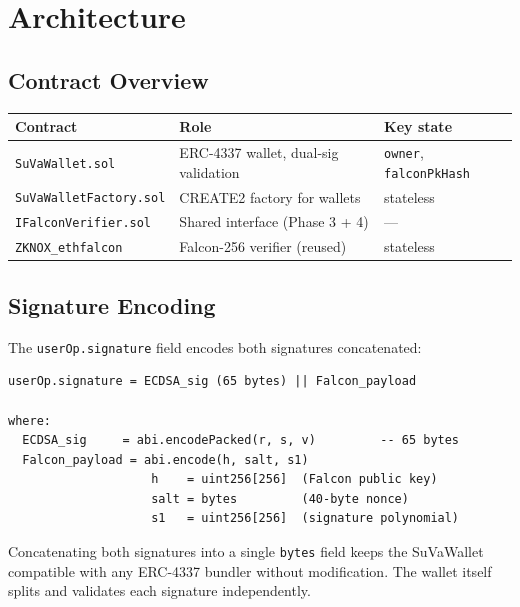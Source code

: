 \documentclass[11pt,a4paper]{article}
\begin{document}
\section{Architecture}

\subsection{Contract Overview}

\begin{center}
\begin{tabular}{lll}
\toprule
\textbf{Contract} & \textbf{Role} & \textbf{Key state} \\
\midrule
\texttt{SuVaWallet.sol}        & ERC-4337 wallet, dual-sig validation & \texttt{owner}, \texttt{falconPkHash} \\
\texttt{SuVaWalletFactory.sol} & CREATE2 factory for wallets          & stateless \\
\texttt{IFalconVerifier.sol}   & Shared interface (Phase 3 + 4)       & --- \\
\texttt{ZKNOX\_ethfalcon}      & Falcon-256 verifier (reused)         & stateless \\
\bottomrule
\end{tabular}
\end{center}

\subsection{Signature Encoding}

The \texttt{userOp.signature} field encodes both signatures concatenated:

\begin{lstlisting}[style=bash, caption={Composite signature layout}]
userOp.signature = ECDSA_sig (65 bytes) || Falcon_payload

where:
  ECDSA_sig     = abi.encodePacked(r, s, v)         -- 65 bytes
  Falcon_payload = abi.encode(h, salt, s1)
                    h    = uint256[256]  (Falcon public key)
                    salt = bytes         (40-byte nonce)
                    s1   = uint256[256]  (signature polynomial)
\end{lstlisting}

\begin{infobox}
Concatenating both signatures into a single \texttt{bytes} field keeps the SuVaWallet
compatible with any ERC-4337 bundler without modification. The wallet itself splits and
validates each signature independently.
\end{infobox}
\end{document}
